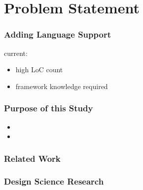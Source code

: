 \section{Problem Statement}
\begin{frame}
  \frametitle{}
  \centering
  \hspace{-1cm}
  \huge
\end{frame}


\begin{frame}
  \frametitle{Adding Language Support}
  current:
  \begin{itemize}
    \item high LoC count
    \item framework knowledge required
  \end{itemize}
\end{frame}

\begin{frame}
  \frametitle{Purpose of this Study}
  \vspace{-1cm}
   \begin{itemize}
     \item {}
     \item {}
   \end{itemize} 
\end{frame}

\begin{frame}
  \frametitle{Related Work}

  

\end{frame}

\begin{frame}
  \frametitle{Design Science Research}

  

\end{frame}


